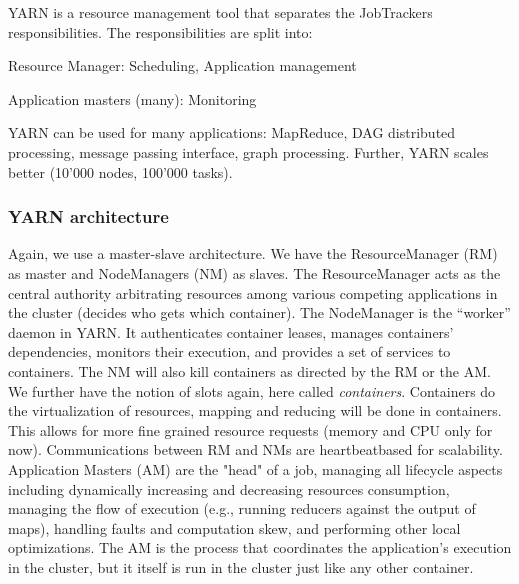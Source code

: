 \documentclass[11pt,oneside,a4paper]{article}
\begin{document}
YARN is a resource management tool that separates the JobTrackers responsibilities. The responsibilities are split into:

\begin{compactitem}
\item Resource Manager: Scheduling, Application management
\item Application masters (many): Monitoring
\end{compactitem}

YARN can be used for many applications: MapReduce, DAG distributed processing, message passing interface, graph processing. Further, YARN scales better (10'000 nodes, 100'000 tasks).


\subsubsection{YARN architecture}

Again, we use a master-slave architecture. We have the ResourceManager (RM) as master and NodeManagers (NM) as slaves. The ResourceManager acts as the central authority arbitrating resources among
various competing applications in the cluster (decides who gets which container). The NodeManager is the “worker” daemon in YARN. It authenticates container leases, manages containers’ dependencies, monitors their execution, and provides a set of services to containers. The NM will also kill containers as directed by the RM or the AM. We further have the notion of slots again, here called \textit{containers}. Containers do the virtualization of resources, mapping and reducing will be done in containers. This allows for more fine grained resource requests (memory and CPU only for now). Communications between RM and NMs are heartbeatbased for scalability. Application Masters (AM) are the "head" of a job, managing all lifecycle aspects including dynamically increasing and decreasing resources consumption, managing the flow of execution (e.g., running reducers against the output of maps), handling faults and computation skew, and performing other local optimizations. The AM is the process that coordinates the application’s execution in the cluster, but it itself is run in the cluster just like any other container. \\
\end{document}
